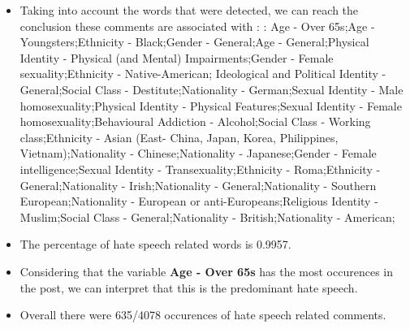 \documentclass[11pt]{article}
\begin{document}
\begin{itemize}\item Taking into account the words that were detected, we can reach the conclusion these comments are associated with : : Age - Over 65s;Age - Youngsters;Ethnicity - Black;Gender - General;Age - General;Physical Identity - Physical (and Mental) Impairments;Gender - Female sexuality;Ethnicity - Native-American; Ideological and Political Identity - General;Social Class - Destitute;Nationality - German;Sexual Identity - Male homosexuality;Physical Identity - Physical Features;Sexual Identity - Female homosexuality;Behavioural Addiction - Alcohol;Social Class - Working class;Ethnicity - Asian (East- China, Japan, Korea, Philippines, Vietnam);Nationality - Chinese;Nationality - Japanese;Gender - Female intelligence;Sexual Identity - Transexuality;Ethnicity - Roma;Ethnicity - General;Nationality - Irish;Nationality - General;Nationality - Southern European;Nationality - European or anti-Europeans;Religious Identity - Muslim;Social Class - General;Nationality - British;Nationality - American;%

\item The percentage of hate speech related words is 0.9957.

\item Considering that the variable \textbf{Age - Over 65s} has the most occurences in the post, we can interpret that this is the predominant hate speech.

\item Overall there were 635/4078 occurences of hate speech related comments.\end{itemize}
\end{document}
